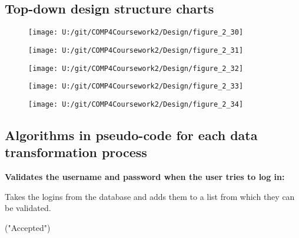 \subsection{Top-down design structure charts}

\begin{figure}[H]
    \label{fig:print_function_result}\caption{}
    \texttt{[image: U:/git/COMP4Coursework2/Design/figure\_2\_30]}
\end{figure}

\begin{figure}[H]
    \label{fig:print_function_result}\caption{}
    \texttt{[image: U:/git/COMP4Coursework2/Design/figure\_2\_31]}
\end{figure}

\begin{figure}[H]
    \label{fig:print_function_result}\caption{}
    \texttt{[image: U:/git/COMP4Coursework2/Design/figure\_2\_32]}
\end{figure}

\begin{figure}[H]
    \label{fig:print_function_result}\caption{}
    \texttt{[image: U:/git/COMP4Coursework2/Design/figure\_2\_33]}
\end{figure}

\begin{figure}[H]
    \label{fig:print_function_result}\caption{}
    \texttt{[image: U:/git/COMP4Coursework2/Design/figure\_2\_34]}
\end{figure}

\subsection{Algorithms in pseudo-code for each data transformation process}

\textbf{Validates the username and password when the user tries to log in:}

\begin{algorithm}[H]
\caption{Takes the logins from the database and adds them to a list from which they can be validated.}
\begin{algorithmic}[1]
\EndFor
{}
		\SEND("Accepted")
	\Else{}
	\EndIf
\EndWhile
\end{algorithmic}
\end{algorithm}

